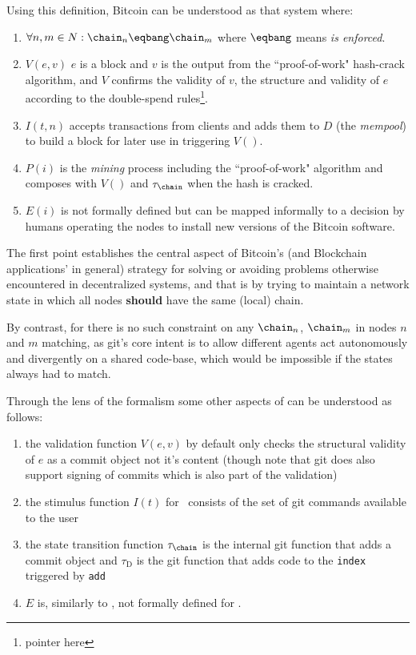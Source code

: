 \documentclass[twocolumn,showpacs,%
  nofootinbib,aps,superscriptaddress,%
  eqsecnum,prd,notitlepage,showkeys,10pt]{revtex4-1}
\begin{document}
Using this definition, Bitcoin can be understood as that system \sbtc where:
\begin{enumerate}
\item $\forall n,m \in N: \chain_n\eqbang\chain_m$ where $\eqbang$ means \textit{is enforced}.
\item $V(e,v)$ $e$ is a block and $v$ is the output from the ``proof-of-work" hash-crack algorithm, and $V$ confirms the validity of $v$, the structure and validity of $e$ according to the double-spend rules\footnote{pointer here}.
\item $I(t,n)$ accepts transactions from clients and adds them to $D$ (the \textit{mempool}) to build a block for later use in triggering $V()$.
\item $P(i)$ is the \textit{mining} process including the ``proof-of-work" algorithm and composes with $V()$ and $\tau_\chain$ when the hash is cracked.
\item $E(i)$ is not formally defined but can be mapped informally to a decision by humans operating the nodes to install new versions of the Bitcoin software.
\end{enumerate}

The first point establishes the central aspect of Bitcoin's (and Blockchain applications' in general) strategy for solving or avoiding problems otherwise encountered in decentralized systems, and that is by trying to maintain a network state in which all nodes \textbf{should} have the same (local) chain.

By contrast, for \sgit there is no such constraint on any $\chain_n$, $\chain_m$ in nodes $n$ and $m$ matching, as git's core intent is to allow different agents act autonomously and divergently on a shared code-base, which would be impossible if the states always had to match.

Through the lens of the formalism some other aspects of \sgit can be understood as follows:
\begin{enumerate}
\item the validation function $V(e,v)$ by default only checks the structural validity of $e$ as a commit object not it's content (though note that git does also support signing of commits which is also part of the validation)
\item the stimulus function $I(t)$ for \sgit\ consists of the set of git commands available to the user
\item the state transition function $\tau_\chain$ is the internal git function that adds a commit object and $\tau_\textrm{D}$ is the git function that adds code to the \texttt{index} triggered by \texttt{add}
\item $E$ is, similarly to \sbtc, not formally defined for \sgit.
\end{enumerate}
\end{document}
